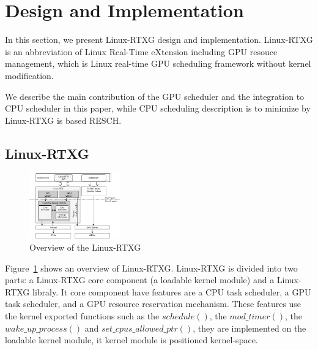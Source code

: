 \section{Design and Implementation}\label{sec:design_imple}
In this section, we present Linux-RTXG design and implementation.
Linux-RTXG is an abbreviation of Linux Real-Time eXtension including GPU resouce management,
which is Linux real-time GPU scheduling framework without kernel modification.

We describe the main contribution of the GPU scheduler and the integration to CPU scheduler in this paper,
while CPU scheduling description is to minimize by Linux-RTXG is based RESCH.


\subsection{Linux-RTXG}
\begin{figure}[t]
\begin{center}
\includegraphics[width=0.35\textwidth]{img/overview.pdf}
\caption{Overview of the Linux-RTXG}
\label{fig:overview}
\end{center}
\end{figure}

Figure~\ref{fig:overview} shows an overview of Linux-RTXG.
Linux-RTXG is divided into two parts: a Linux-RTXG core component (a loadable kernel module) and a Linux-RTXG libraly.
It core component have features are a CPU task scheduler, a GPU task scheduler, and a GPU resource reservation mechanism.
These features use the kernel exported functions such as the $schedule()$, the $mod\_timer()$, the $wake\_up\_process()$ and $set\_cpus\_allowed\_ptr()$, they are implemented on the loadable kernel module, it kernel module is positioned kernel-space. 


